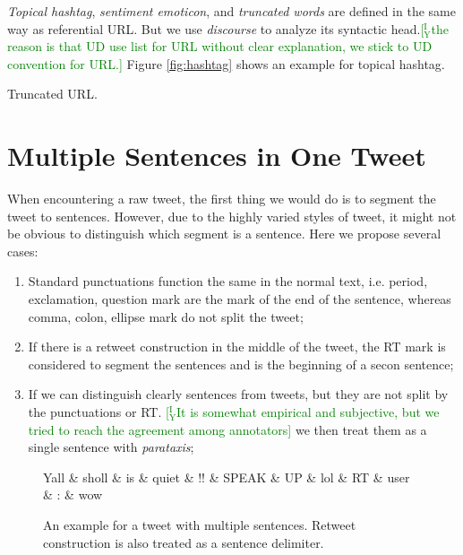 \documentclass[11pt,a4paper]{article}
\newcommand{\yicomment}[1]{\textcolor{green}{[$_\mathrm{Y}^\mathrm{I}$#1]}}
\begin{document}
\textit{Topical hashtag}, \textit{sentiment emoticon}, and \textit{truncated words}
are defined in the same way as referential URL.
But we use \textit{discourse} to analyze its syntactic head.\yicomment{the reason is that UD use list for URL without clear explanation, we stick to UD convention for URL.}
Figure \ref{fig:hashtag} shows an example for topical hashtag.

Truncated URL.

\section{Multiple Sentences in One Tweet}\label{sec:sent-seg}
When encountering a raw tweet, 
the first thing we would do is to segment the tweet to sentences.
However, due to the highly varied styles of tweet, 
it might not be obvious to distinguish which segment is a sentence.
Here we propose several cases:
\begin{enumerate}
	\item Standard punctuations function the same in the normal text,
	i.e. period, exclamation, question mark are the mark of the end of the sentence,
	whereas comma, colon, ellipse mark do not split the tweet;
	\item If there is a retweet construction in the middle of the tweet,
	the RT mark is considered to segment the sentences and is the beginning of a secon sentence;
	\item If we can distinguish clearly sentences from tweets, 
	but they are not split by the punctuations or RT. \yicomment{It is somewhat empirical and subjective, but we tried to reach the agreement among annotators}
	we then treat them as a single sentence with \textit{parataxis};
\end{enumerate}

\begin{figure}[t]
	\centering
	\small
	\begin{dependency}[edge slant=2, text only label, label style=above]
		\begin{deptext}
			Yall \& sholl \& is \& quiet \& !! \& SPEAK \& UP \& lol \& RT \& user \& : \& wow \\
		\end{deptext}
	\end{dependency}
	\caption{An example for a tweet with multiple sentences. 
		Retweet  construction is also treated as a sentence delimiter.}\label{fig:multi-seg}
\end{figure}
\end{document}

